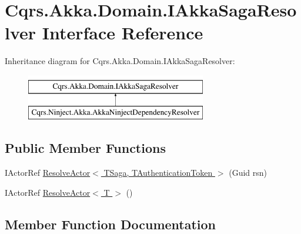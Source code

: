 \hypertarget{interfaceCqrs_1_1Akka_1_1Domain_1_1IAkkaSagaResolver}{}\section{Cqrs.\+Akka.\+Domain.\+I\+Akka\+Saga\+Resolver Interface Reference}
\label{interfaceCqrs_1_1Akka_1_1Domain_1_1IAkkaSagaResolver}
Inheritance diagram for Cqrs.\+Akka.\+Domain.\+I\+Akka\+Saga\+Resolver\+:\begin{figure}[H]
\begin{center}
\leavevmode
\includegraphics[height=2.000000cm]{interfaceCqrs_1_1Akka_1_1Domain_1_1IAkkaSagaResolver}
\end{center}
\end{figure}
\subsection*{Public Member Functions}
\begin{DoxyCompactItemize}
\item 
I\+Actor\+Ref \hyperlink{interfaceCqrs_1_1Akka_1_1Domain_1_1IAkkaSagaResolver_ab41671bdbd0d7d83552b5e11e47fe36d_ab41671bdbd0d7d83552b5e11e47fe36d}{Resolve\+Actor$<$ T\+Saga, T\+Authentication\+Token $>$} (Guid rsn)
\item 
I\+Actor\+Ref \hyperlink{interfaceCqrs_1_1Akka_1_1Domain_1_1IAkkaSagaResolver_adb17ca8a4e09839e67bc9fa0a6ee843f_adb17ca8a4e09839e67bc9fa0a6ee843f}{Resolve\+Actor$<$ T $>$} ()
\end{DoxyCompactItemize}


\subsection{Member Function Documentation}
\mbox{\label{interfaceCqrs_1_1Akka_1_1Domain_1_1IAkkaSagaResolver_adb17ca8a4e09839e67bc9fa0a6ee843f_adb17ca8a4e09839e67bc9fa0a6ee843f}} 
